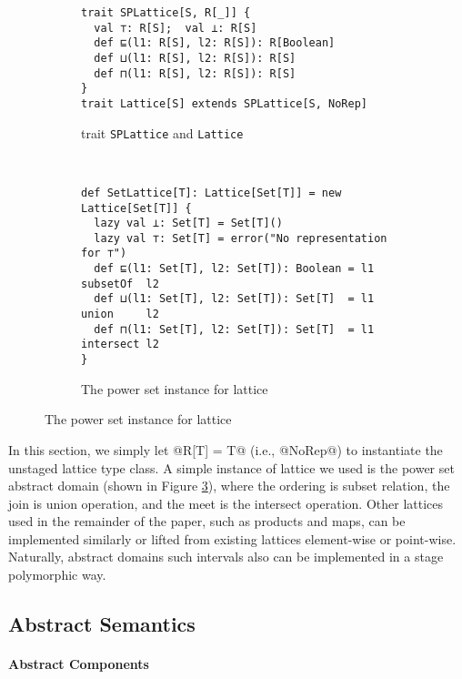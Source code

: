 \begin{figure}[h!]
  \centering
  \begin{subfigure}[b]{0.45\textwidth}
  \begin{lstlisting}[style=small]
trait SPLattice[S, R[_]] {
  val ⊤: R[S];  val ⊥: R[S]
  def ⊑(l1: R[S], l2: R[S]): R[Boolean]
  def ⊔(l1: R[S], l2: R[S]): R[S]
  def ⊓(l1: R[S], l2: R[S]): R[S]
}
trait Lattice[S] extends SPLattice[S, NoRep]
  \end{lstlisting}
  \caption{trait \texttt{SPLattice} and \texttt{Lattice}} \label{fig:splattice}
  \end{subfigure}
  ~
  \begin{subfigure}[b]{0.6\textwidth}
\begin{lstlisting}[style=small]
def SetLattice[T]: Lattice[Set[T]] = new Lattice[Set[T]] {
  lazy val ⊥: Set[T] = Set[T]()
  lazy val ⊤: Set[T] = error("No representation for ⊤")
  def ⊑(l1: Set[T], l2: Set[T]): Boolean = l1 subsetOf  l2
  def ⊔(l1: Set[T], l2: Set[T]): Set[T]  = l1 union     l2
  def ⊓(l1: Set[T], l2: Set[T]): Set[T]  = l1 intersect l2
}
\end{lstlisting}
  \caption{The power set instance for lattice} \label{fig:powerset}
\end{subfigure}
\end{figure}

In this section, we simply let @R[T] = T@ (i.e., @NoRep@) to instantiate the
unstaged lattice type class. A simple instance of lattice we used is the power
set abstract domain (shown in Figure \ref{fig:powerset}), where the ordering is subset relation, the join is union
operation, and the meet is the intersect operation.
Other lattices used in the remainder of the paper, such as products and maps, can be
implemented similarly or lifted from existing lattices element-wise or
point-wise. Naturally, abstract domains such intervals also can be implemented
in a stage polymorphic way.

\subsection{Abstract Semantics}

\paragraph{Abstract Components}


